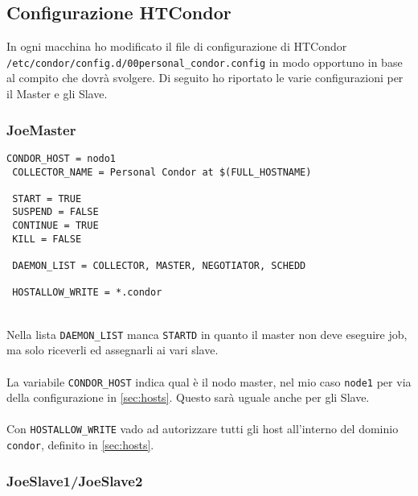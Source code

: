 \subsection{Configurazione HTCondor}

In ogni macchina ho modificato il file di configurazione di HTCondor \lstinline[style=cmd]|/etc/condor/config.d/00personal_condor.config| in modo opportuno in base al compito che dovr\`{a} svolgere. Di seguito ho riportato le varie configurazioni per il Master e gli Slave.


\subsubsection{JoeMaster}

\begin{lstlisting}[style=cmd]
 CONDOR_HOST = nodo1
 COLLECTOR_NAME = Personal Condor at $(FULL_HOSTNAME)
 
 START = TRUE
 SUSPEND = FALSE
 CONTINUE = TRUE
 KILL = FALSE
 
 DAEMON_LIST = COLLECTOR, MASTER, NEGOTIATOR, SCHEDD
 
 HOSTALLOW_WRITE = *.condor
\end{lstlisting}
\ \\
Nella lista \lstinline[style=cmd]|DAEMON_LIST| manca \lstinline[style=cmd]|STARTD| in quanto il master non deve eseguire job, ma solo riceverli ed assegnarli ai vari slave.\\
\ \\
La variabile \lstinline[style=cmd]|CONDOR_HOST| indica qual \`{e} il nodo master, nel mio caso \lstinline[style=cmd]|node1| per via della configurazione in \autoref{sec:hosts}. Questo sar\`{a} uguale anche per gli Slave.\\
\ \\
Con \lstinline[style=cmd]|HOSTALLOW_WRITE| vado ad autorizzare tutti gli host all'interno del dominio \lstinline[style=cmd]|condor|, definito in \autoref{sec:hosts}.
	
\subsubsection{JoeSlave1/JoeSlave2}
\label{sec:joeslave}


